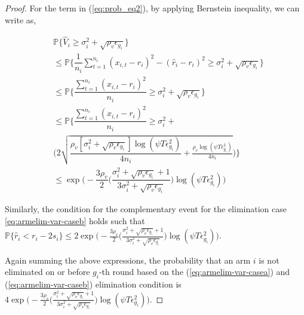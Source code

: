 \begin{proof}
  
For the term in (\ref{eq:prob_eq2}), by applying Bernstein inequality, we can write as,
\begin{small}
\begin{align*}
&\mathbb{P}\bigg\lbrace \hat{V}_{i}\geq \sigma_{i}^{2}+\sqrt{\rho_{v}\epsilon_{g_{i}}}\bigg\rbrace\\
&\leq \mathbb{P}\bigg\lbrace \dfrac{1}{n_{i}}\sum_{t=1}^{n_{i}}(x_{i,t}-r_{i})^{2}-(\hat{r}_{i}-r_{i})^{2}\geq \sigma_{i}^{2}+\sqrt{\rho_{v}\epsilon_{g_{i}}}\bigg\rbrace\\
&\leq \mathbb{P}\bigg\lbrace \dfrac{\sum_{t=1}^{n_{i}}(x_{i,t}-r_{i})^{2}}{n_{i}}\geq \sigma_{i}^{2}+\sqrt{\rho_{v}\epsilon_{g_{i}}} \bigg\rbrace\\
&\leq \mathbb{P}\bigg\lbrace \dfrac{\sum_{t=1}^{n_{i}}(x_{i,t}-r_{i})^{2}}{n_{i}}\geq \sigma_{i}^{2} +\\
&\bigg(2\sqrt{\dfrac{\rho_v [\sigma_{i}^{2}+\sqrt{\rho_{v}\epsilon_{g_{i}}}]\log(\psi T\epsilon_{g_{i}}^{2})}{4n_{i}}+\frac{\rho_v \log{(\psi T\epsilon_{g_{i}}^{2})}}{4 n_{i}}}\bigg)\bigg\rbrace\\
&\leq \exp\bigg(- \dfrac{3\rho_v}{2} \bigg(\dfrac{\sigma_{i}^{2}+\sqrt{\rho_{v}\epsilon_{g_{i}}}+1}{3\sigma_{i}^{2}+\sqrt{\rho_v \epsilon_{g_{i}}}}\bigg) \log(\psi T\epsilon_{g_{i}}^{2}) \bigg) 
\end{align*}
\end{small}
 
  
Similarly, the condition for the complementary event for the elimination case \ref{eq:armelim-var-caseb} holds such that $\mathbb{P}\lbrace\hat{r}_{i}< r_{i} - 2s_{i}\rbrace \leq 2\exp\bigg(- \frac{3\rho_v}{2} \bigg(\frac{\sigma_{i}^{2}+\sqrt{\rho_{v}\epsilon_{g_{i}}}+1}{3\sigma_{i}^{2}+\sqrt{\rho_v \epsilon_{g_{i}}}}\bigg) \log(\psi T\epsilon_{g_{i}}^{2}) \bigg)$.

Again  summing the above expressions, the probability that an arm ${i}$ is not eliminated on or before $g_{i}$-th round based on the (\ref{eq:armelim-var-casea}) and (\ref{eq:armelim-var-caseb}) elimination condition is  $4\exp\bigg(- \frac{3\rho_v}{2} \bigg(\frac{\sigma_{i}^{2}+\sqrt{\rho_{v}\epsilon_{g_{i}}}+1}{3\sigma_{i}^{2}+\sqrt{\rho_v \epsilon_{g_{i}}}}\bigg) \log(\psi T\epsilon_{g_{i}}^{2}) \bigg)$. 
  

\end{proof}
